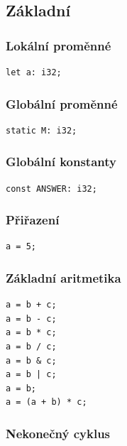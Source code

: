 \documentclass[12pt,a4paper]{article}
\begin{document}
\subsection{Základní}

\subsubsection*{Lokální proměnné}

\begin{verbatim}
let a: i32;
\end{verbatim}

\subsubsection*{Globální proměnné}

\begin{verbatim}
static M: i32;
\end{verbatim}

\subsubsection*{Globální konstanty}

\begin{verbatim}
const ANSWER: i32;
\end{verbatim}

\subsubsection*{Přiřazení}

\begin{verbatim}
a = 5;
\end{verbatim}

\subsubsection*{Základní aritmetika}

\begin{verbatim}
a = b + c;
a = b - c;
a = b * c;
a = b / c;
a = b & c;
a = b | c;
a = b;
a = (a + b) * c;
\end{verbatim}

\subsubsection*{Nekonečný cyklus}
\end{document}
